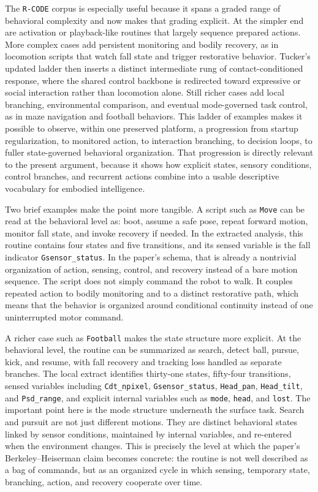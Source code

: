 \documentclass[11pt]{article}
\begin{document}
The \texttt{R-CODE} corpus is especially useful because it spans a graded range of behavioral complexity and now makes that grading explicit. At the simpler end are activation or playback-like routines that largely sequence prepared actions. More complex cases add persistent monitoring and bodily recovery, as in locomotion scripts that watch fall state and trigger restorative behavior. Tucker's updated ladder then inserts a distinct intermediate rung of contact-conditioned response, where the shared control backbone is redirected toward expressive or social interaction rather than locomotion alone. Still richer cases add local branching, environmental comparison, and eventual mode-governed task control, as in maze navigation and football behaviors. This ladder of examples makes it possible to observe, within one preserved platform, a progression from startup regularization, to monitored action, to interaction branching, to decision loops, to fuller state-governed behavioral organization. That progression is directly relevant to the present argument, because it shows how explicit states, sensory conditions, control branches, and recurrent actions combine into a usable descriptive vocabulary for embodied intelligence.

Two brief examples make the point more tangible. A script such as \texttt{Move} can be read at the behavioral level as: boot, assume a safe pose, repeat forward motion, monitor fall state, and invoke recovery if needed. In the extracted analysis, this routine contains four states and five transitions, and its sensed variable is the fall indicator \texttt{Gsensor\_status}. In the paper's schema, that is already a nontrivial organization of action, sensing, control, and recovery instead of a bare motion sequence. The script does not simply command the robot to walk. It couples repeated action to bodily monitoring and to a distinct restorative path, which means that the behavior is organized around conditional continuity instead of one uninterrupted motor command.

A richer case such as \texttt{Football} makes the state structure more explicit. At the behavioral level, the routine can be summarized as search, detect ball, pursue, kick, and resume, with fall recovery and tracking loss handled as separate branches. The local extract identifies thirty-one states, fifty-four transitions, sensed variables including \texttt{Cdt\_npixel}, \texttt{Gsensor\_status}, \texttt{Head\_pan}, \texttt{Head\_tilt}, and \texttt{Psd\_range}, and explicit internal variables such as \texttt{mode}, \texttt{head}, and \texttt{lost}. The important point here is the mode structure underneath the surface task. Search and pursuit are not just different motions. They are distinct behavioral states linked by sensor conditions, maintained by internal variables, and re-entered when the environment changes. This is precisely the level at which the paper's Berkeley--Heiserman claim becomes concrete: the routine is not well described as a bag of commands, but as an organized cycle in which sensing, temporary state, branching, action, and recovery cooperate over time.
\end{document}
